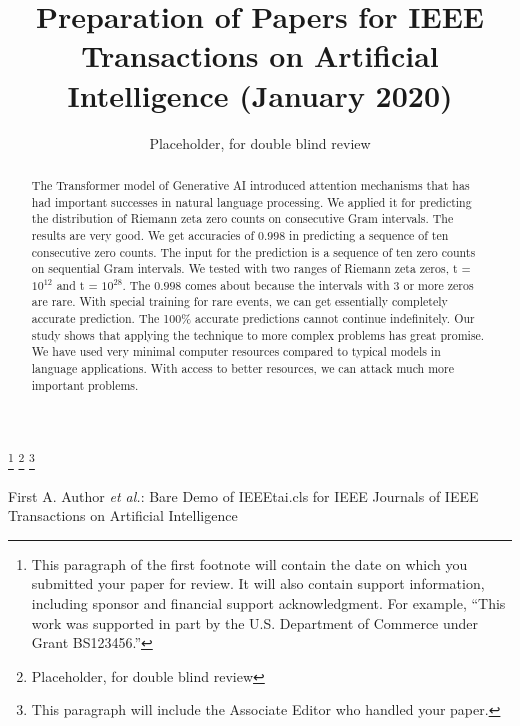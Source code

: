 \documentclass[journal]{IEEEtai}
\begin{document}
\title{Preparation of Papers for IEEE {\sc Transactions on Artificial Intelligence} (January 2020)} 


\author{Placeholder, for double blind review}
\thanks{This paragraph of the first footnote will contain the date on which you submitted your paper for review. It will also contain support information, including sponsor and financial support acknowledgment. For example, ``This work was supported in part by the U.S. Department of Commerce under Grant BS123456.'' }
\thanks{Placeholder, for double blind review}
\thanks{This paragraph will include the Associate Editor who handled your paper.}

{First A. Author \MakeLowercase{\textit{et al.}}: Bare Demo of IEEEtai.cls for IEEE Journals of IEEE Transactions on Artificial Intelligence}

\maketitle

\begin{abstract}
The Transformer model of Generative AI introduced attention mechanisms that has had important successes in natural language processing.  We applied it for predicting the distribution of Riemann zeta zero counts on consecutive Gram intervals. The results are very good. We get accuracies of $0.998$ in predicting a sequence of ten consecutive zero counts. The input for the prediction is a sequence of ten zero counts on sequential Gram intervals. We tested with two ranges of Riemann zeta zeros, t = $10^{12}$ and t = $10^{28}$. The $0.998$ comes about because the intervals with $3$ or more zeros are rare. With special training for rare events, we can get essentially completely accurate prediction. The 100\% accurate predictions cannot continue indefinitely. Our study shows that applying the technique to more complex problems has great promise. We have used very minimal computer resources compared to typical models in language applications. With access to better resources, we can attack much more important problems. 
\end{abstract}
\end{document}
